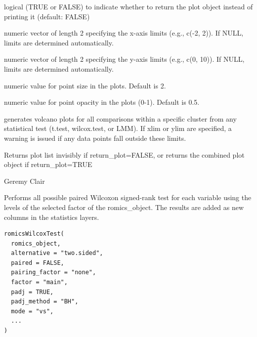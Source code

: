 \documentclass[a4paper]{book}
\begin{document}
\begin{Arguments}
\begin{ldescription}
\item[\code{return\_plot}] logical (TRUE or FALSE) to indicate whether to return the plot object instead of printing it (default: FALSE)

\item[\code{xlim}] numeric vector of length 2 specifying the x-axis limits (e.g., c(-2, 2)). If NULL, limits are determined automatically.

\item[\code{ylim}] numeric vector of length 2 specifying the y-axis limits (e.g., c(0, 10)). If NULL, limits are determined automatically.

\item[\code{size}] numeric value for point size in the plots. Default is 2.

\item[\code{alpha}] numeric value for point opacity in the plots (0-1). Default is 0.5.
\end{ldescription}
\end{Arguments}
%
\begin{Details}
generates volcano plots for all comparisons within a specific cluster from any statistical test (t.test, wilcox.test, or LMM). If xlim or ylim are specified, a warning is issued if any data points fall outside these limits.
\end{Details}
%
\begin{Value}
Returns plot list invisibly if return\_plot=FALSE, or returns the combined plot object if return\_plot=TRUE
\end{Value}
%
\begin{Author}
Geremy Clair
\end{Author}
%
\begin{Description}
Performs all possible paired Wilcoxon signed-rank test for each variable using the levels of the selected factor of the romics\_object. The results are added as new columns in the statistics layers.
\end{Description}
%
\begin{Usage}
\begin{verbatim}
romicsWilcoxTest(
  romics_object,
  alternative = "two.sided",
  paired = FALSE,
  pairing_factor = "none",
  factor = "main",
  padj = TRUE,
  padj_method = "BH",
  mode = "vs",
  ...
)
\end{verbatim}
\end{Usage}
%
\end{document}

